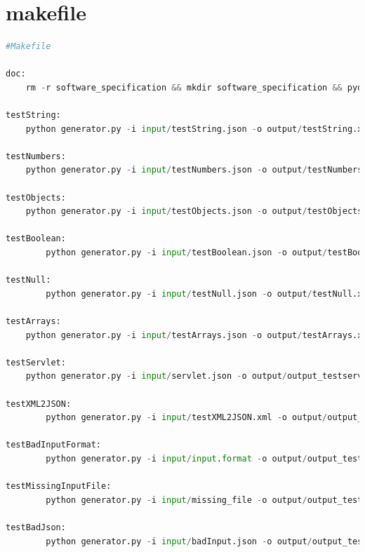\documentclass[a4paper,11pt]{book}
\begin{document}
\section{makefile}
\begin{lstlisting}[language=python,caption={makefile }]
#Makefile

doc:
	rm -r software_specification && mkdir software_specification && pydoc -w ./ && mv ./*.html software_specification/

testString:
	python generator.py -i input/testString.json -o output/testString.xml -d

testNumbers:
	python generator.py -i input/testNumbers.json -o output/testNumbers.xml -d

testObjects:
	python generator.py -i input/testObjects.json -o output/testObjects.xml -d

testBoolean:
		python generator.py -i input/testBoolean.json -o output/testBoolean.xml -d

testNull:
		python generator.py -i input/testNull.json -o output/testNull.xml -d

testArrays:
	python generator.py -i input/testArrays.json -o output/testArrays.xml -d

testServlet:
	python generator.py -i input/servlet.json -o output/output_testservlet.xml -d

testXML2JSON:
		python generator.py -i input/testXML2JSON.xml -o output/output_testXML2JSON.json -d

testBadInputFormat:
		python generator.py -i input/input.format -o output/output_testBadInputFormat.xml -d

testMissingInputFile:
		python generator.py -i input/missing_file -o output/output_testmissingfile.xml -d

testBadJson:
		python generator.py -i input/badInput.json -o output/output_testBAdInput.xml -d

\end{lstlisting}



%
%
%
%

%
%

\thispagestyle{empty}
\end{document}
